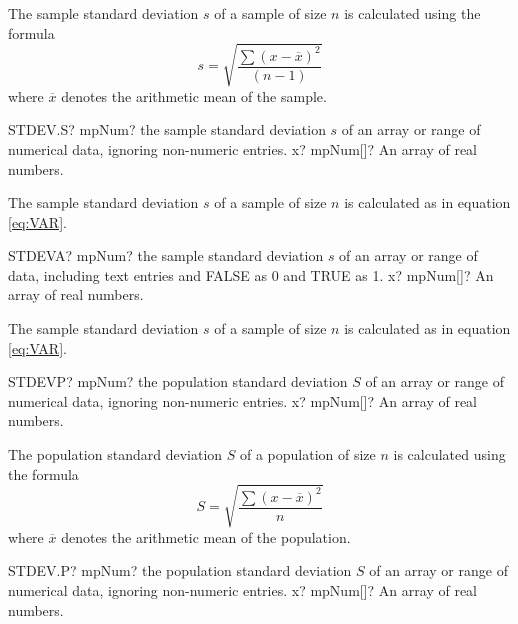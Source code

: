 The sample standard deviation $s$ of a sample of size $n$ is calculated using the formula
\begin{equation}  \label{eq:STDEV}
	s = \sqrt{\frac{\sum (x-\overline{x})^2}{(n-1)}}  
\end{equation}
where $\overline{x}$ denotes the arithmetic mean of the sample.



\vspace{0.6cm}
\begin{mpFunctionsExtract}
	\mpWorksheetFunctionOneNotImplemented
	{STDEV.S? mpNum? the sample standard deviation $s$ of an array or range of numerical data, ignoring non-numeric entries.}
	{x? mpNum[]? An array of real numbers.}
\end{mpFunctionsExtract}

The sample standard deviation $s$ of a sample of size $n$ is calculated as in equation \ref{eq:VAR}.



\vspace{0.6cm}
\begin{mpFunctionsExtract}
	\mpWorksheetFunctionOneNotImplemented
	{STDEVA? mpNum? the sample standard deviation $s$ of an array or range of data, including text entries and FALSE as 0 and TRUE as 1.}
	{x? mpNum[]? An array of real numbers.}
\end{mpFunctionsExtract}

The sample standard deviation $s$ of a sample of size $n$ is calculated as in equation \ref{eq:VAR}.


\vspace{0.6cm}
\begin{mpFunctionsExtract}
	\mpWorksheetFunctionOneNotImplemented
	{STDEVP? mpNum? the population standard deviation $S$ of an array or range of numerical data, ignoring non-numeric entries.}
	{x? mpNum[]? An array of real numbers.}
\end{mpFunctionsExtract}

The population standard deviation $S$ of a population of size $n$ is calculated using the formula
\begin{equation}  \label{eq:STDEVP}
	S = \sqrt{\frac{\sum (x-\overline{x})^2}{n}} 
\end{equation}
where $\overline{x}$ denotes the arithmetic mean of the population.



\vspace{0.6cm}
\begin{mpFunctionsExtract}
	\mpWorksheetFunctionOneNotImplemented
	{STDEV.P? mpNum? the population standard deviation $S$ of an array or range of numerical data, ignoring non-numeric entries.}
	{x? mpNum[]? An array of real numbers.}
\end{mpFunctionsExtract}

